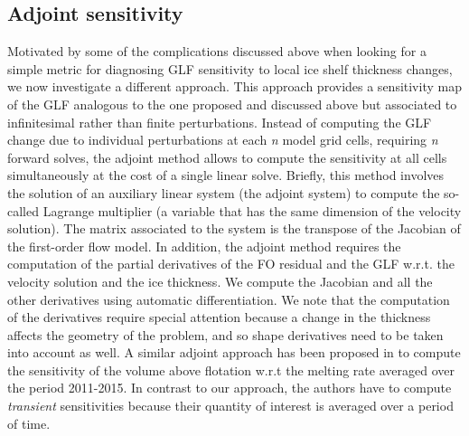 \documentclass[tc, manuscript]{copernicus}
\begin{document}
\subsection{Adjoint sensitivity}

Motivated by some of the complications discussed above when looking for a simple metric for diagnosing GLF sensitivity to local ice shelf thickness changes, we now investigate a different approach. This approach provides a sensitivity map of the GLF analogous to the one proposed and discussed above but associated to infinitesimal rather than finite perturbations. Instead of computing the GLF change due to individual perturbations at each \textit{n} model grid cells, requiring \textit{n} forward solves, the adjoint method allows to compute the sensitivity at all  cells simultaneously at the cost of a single linear solve. Briefly, this method involves the solution of an auxiliary linear system (the adjoint system) to compute the so-called Lagrange multiplier (a variable that has the same dimension of the velocity solution). The matrix associated to the system is the transpose of the Jacobian of the first-order flow model. In addition, the adjoint method requires the computation of the partial derivatives of the FO residual and the GLF w.r.t. the velocity solution and the ice thickness. We compute the Jacobian and all the other derivatives using automatic differentiation.
We note that the computation of the derivatives require special attention because a change in the thickness affects the geometry of the problem, and so shape derivatives need to be taken into account as well.
A similar adjoint approach has been proposed in \cite{Goldberg2019} to compute the sensitivity of the volume above flotation w.r.t the melting rate averaged over the period 2011-2015. In contrast to our approach, the authors have to compute \emph{transient} sensitivities because their quantity of interest is averaged over a period of time.  

\end{document}
